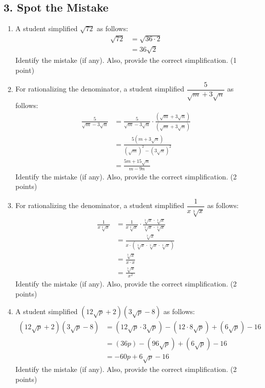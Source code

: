 \documentclass{hw}
\begin{document}
\subsection*{\normalsize 3. Spot the Mistake}
\begin{enumerate}[label=\alph*.]
    \item A student simplified $\sqrt{72}$ as follows:
        \begin{align*}
        \sqrt{72} &= \sqrt{36 \cdot 2} \\
                    &= 36\sqrt{2}
        \end{align*}
        Identify the mistake (if any). Also, provide the correct simplification. (1 point)
        \studentxlargeworkspace
        
    \item For rationalizing the denominator, a student simplified $\dfrac{5}{\sqrt{m} + 3\sqrt{n}}$ as follows:
        \begin{align*}
            \frac{5}{\sqrt{m} - 3\sqrt{n}} &= \frac{5}{\sqrt{m} - 3\sqrt{n}} \cdot \frac{(\sqrt{m} + 3\sqrt{n})}{(\sqrt{m} + 3\sqrt{n})} \\
                                           &= \frac{5 (m + 3\sqrt{n})}{{(\sqrt{m})}^2 - {(3\sqrt{n})}^2} \\
                                           &= \frac{5m + 15\sqrt{n}}{m - 9n}
        \end{align*}
        Identify the mistake (if any). Also, provide the correct simplification. (2 points)
        \studentxxlargeworkspace
    \newpage
    \item For rationalizing the denominator, a student simplified $\dfrac{1}{x\sqrt[3]{x}}$ as follows:
        \begin{align*}
            \frac{1}{x \sqrt[3]{x}}  &= \frac{1}{x \sqrt[3]{x}} \cdot \frac{\sqrt[3]{x} \cdot \sqrt[3]{x}}{\sqrt[3]{x} \cdot \sqrt[3]{x}} \\
                                    &= \frac{\sqrt[3]{x}}{x \cdot (\sqrt[3]{x} \cdot \sqrt[3]{x} \cdot \sqrt[3]{x}) } \\
                                    &= \frac{\sqrt[3]{x}}{x \cdot x} \\
                                    &= \frac{\sqrt[3]{x}}{x^2}
        \end{align*}
        Identify the mistake (if any). Also, provide the correct simplification. (2 points)
        \studentxxlargeworkspace
    \newpage
    \item A student simplified $(12\sqrt{p} + 2)(3\sqrt{p} - 8)$ as follows:
        \begin{align*}
            (12\sqrt{p} + 2)(3\sqrt{p} - 8) &= (12 \sqrt{p} \cdot 3\sqrt{p}) - (12 \cdot 8 \sqrt{p}) + (6\sqrt{p}) - 16 \\
                                            &= (36p) - (96 \sqrt{p}) + (6\sqrt{p}) - 16 \\
                                            &= -60p + 6\sqrt{p} - 16
        \end{align*}
        Identify the mistake (if any). Also, provide the correct simplification. (2 points)
        \studentxlargeworkspace
\end{enumerate}
\end{document}
